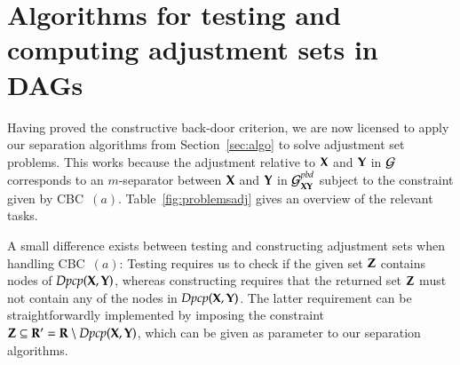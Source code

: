 \section{Algorithms for testing and computing adjustment sets in DAGs}
\label{sec:algorithms:adjustment}


Having proved the constructive back-door criterion, we are now licensed to apply our separation algorithms from Section~\ref{sec:algo} to solve adjustment set problems. This works because the adjustment relative to $ {\bf X} $ and $ {\bf Y} $ in $ {\cal G} $ corresponds to an $ m $-separator between $ {\bf X} $ and $ {\bf Y} $ in $ {\cal G}^{pbd}_{{\bf X}{\bf Y}} $ subject to the constraint given by CBC~$(a)$. Table~\ref{fig:problemsadj} gives an overview of the relevant tasks.

A small difference exists between testing and constructing adjustment sets when handling CBC~$(a)$: Testing requires us to check if the given set $ {\bf Z} $ contains nodes of $ \textit{Dpcp}({\bf X},{\bf Y}) $, whereas constructing requires that the returned set ${\bf Z}$ must not contain any of the nodes in $\textit{Dpcp}({\bf X},{\bf Y})$. The latter requirement can be straightforwardly implemented by imposing the constraint $ {\bf Z} \subseteq {\bf R}' = {\bf R}\setminus\textit{Dpcp}({\bf X},{\bf Y}) $, which can be given as parameter to our separation algorithms. 

%
%
%
%
%
%
%
%
%

